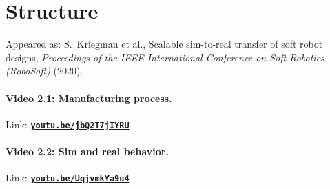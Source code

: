 


\chapter{Structure}


{\footnotesize
\noindent
Appeared as:
S.~Kriegman et al.,
Scalable sim-to-real transfer of soft robot designs,
\textit{Proceedings of the IEEE International Conference on Soft Robotics (RoboSoft)} (2020).
}

\vspace{2em}






\subsubsection*{Video 2.1: Manufacturing process.}
Link: \href{https://youtu.be/jbQ2T7jIYRU}{\textbf{\texttt{youtu.be/jbQ2T7jIYRU}}}


\subsubsection*{Video 2.2: Sim and real behavior.}
Link: \href{https://youtu.be/UqjvmkYa9u4}{\textbf{\texttt{youtu.be/UqjvmkYa9u4}}}



% 

% 



% 

% 


